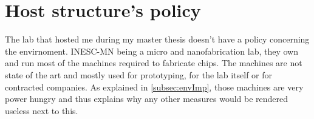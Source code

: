 \section{Host structure's policy}

The lab that hosted me during my master thesis doesn't have a policy concerning the envirnoment. \acs{INESC}-MN being a micro and nanofabrication lab, they own and run most of the machines required to fabricate chips. The machines are not state of the art and mostly used for prototyping, for the lab itself or for contracted companies. As explained in \cref{subsec:envImp}, those machines are very power hungry and thus explains why any other measures would be rendered useless next to this.
